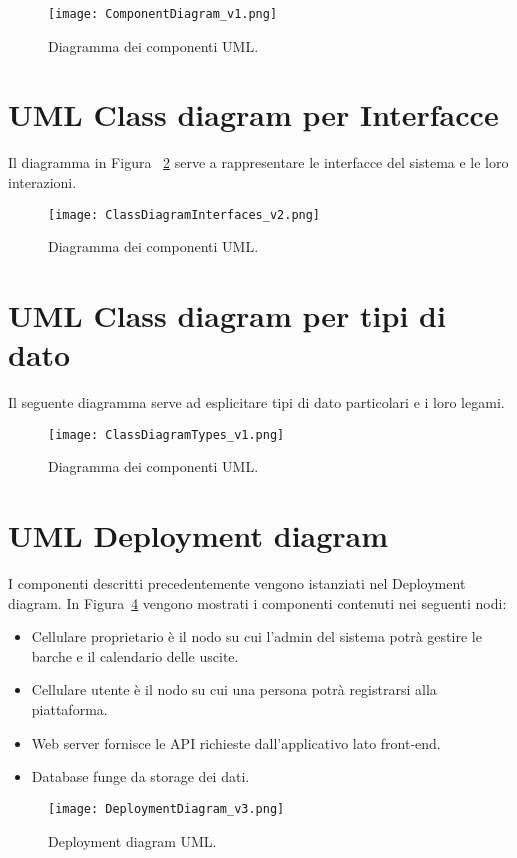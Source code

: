 \begin{figure}[h]
    \centering
    \texttt{[image: ComponentDiagram\_v1.png]}
    \caption{Diagramma dei componenti UML.}\label{fig:componentDiagram}
\end{figure}

\newpage

\section{UML Class diagram per Interfacce}
Il diagramma in Figura ~\ref{fig:ClassDiagramInterfaces} serve a rappresentare le interfacce del sistema e le loro interazioni.
\begin{figure}[h]
    \centering
    \texttt{[image: ClassDiagramInterfaces\_v2.png]}
    \caption{Diagramma dei componenti UML.}\label{fig:ClassDiagramInterfaces}
\end{figure}

\newpage

\section{UML Class diagram per tipi di dato}
Il seguente diagramma serve ad esplicitare tipi di dato particolari e i loro legami.
\begin{figure}[h]
    \centering
    \texttt{[image: ClassDiagramTypes\_v1.png]}
    \caption{Diagramma dei componenti UML.}\label{fig:ClassDiagramTypes}
\end{figure}

\section{UML Deployment diagram}
I componenti descritti precedentemente vengono istanziati nel Deployment diagram. In Figura~\ref{fig:DeploymentDiagram} vengono mostrati i componenti contenuti nei seguenti nodi:

\begin{itemize}
    \item Cellulare proprietario è il nodo su cui l'admin del sistema potrà gestire le barche e il calendario delle uscite.
    \item Cellulare utente è il nodo su cui una persona potrà registrarsi alla piattaforma.
    \item Web server fornisce le API richieste dall'applicativo lato front-end.
    \item Database funge da storage dei dati.
\end{itemize}

\begin{figure}[h]
    \centering
    \texttt{[image: DeploymentDiagram\_v3.png]}
    \caption{Deployment diagram UML.}\label{fig:DeploymentDiagram}
\end{figure}